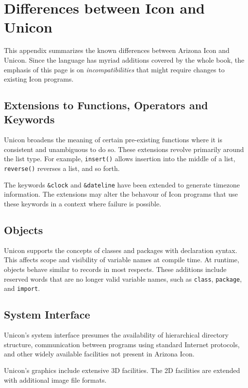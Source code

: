 \chapter{Differences between Icon and Unicon}

\label{Unicon-Icon}
This appendix summarizes the known differences between Arizona Icon and
Unicon. Since the language has myriad additions covered by the whole book,
the emphasis of this page is on {\em incompatibilities\/} that might
require changes to existing Icon programs.

\section{Extensions to Functions, Operators and Keywords}

Unicon broadens the meaning of certain pre-existing functions where it
is consistent and unambiguous to do so. These extensions revolve
primarily around the list type. For example,
\texttt{insert()} allows insertion into the middle of a
list, \texttt{reverse()} reverses a list, and so forth.

The keywords \texttt{\&clock} and
\texttt{\&dateline}
have been extended to generate timezone information. The extensions
may alter the behavour of Icon programs that use these keywords in a
context where failure is possible.

\section{Objects}

Unicon supports the concepts of classes and packages with declaration
syntax. This affects scope and visibility of variable names at compile
time. At runtime, objects behave similar to records in most respects.
These additions include reserved words that are no longer valid variable
names, such as \texttt{class}, \texttt{package}, and \texttt{import}.

\section{System Interface}

Unicon's system interface presumes the availability of
hierarchical directory structure, communication between programs using
standard Internet protocols, and other widely available facilities not
present in Arizona Icon.

Unicon's graphics include extensive 3D facilities.  The 2D facilities
are extended with additional image file formats.

